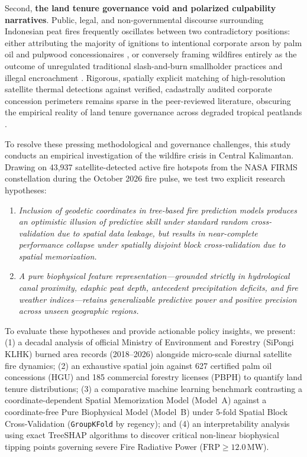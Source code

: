 Second, \textbf{the land tenure governance void and polarized culpability narratives}. Public, legal, and non-governmental discourse surrounding Indonesian peat fires frequently oscillates between two contradictory positions: either attributing the majority of ignitions to intentional corporate arson by palm oil and pulpwood concessionaires \citep{Tacconi2003CIFOR, Carlson2012PNAS}, or conversely framing wildfires entirely as the outcome of unregulated traditional slash-and-burn smallholder practices and illegal encroachment \citep{Cattau2016GCB}. Rigorous, spatially explicit matching of high-resolution satellite thermal detections against verified, cadastrally audited corporate concession perimeters remains sparse in the peer-reviewed literature, obscuring the empirical reality of land tenure governance across degraded tropical peatlands \citep{Putranto2023LandUsePol}.

To resolve these pressing methodological and governance challenges, this study conducts an empirical investigation of the wildfire crisis in Central Kalimantan. Drawing on 43,937 satellite-detected active fire hotspots from the NASA FIRMS constellation during the October 2026 fire pulse, we test two explicit research hypotheses:
\begin{enumerate}
    \item[$\mathbf{H_1}$:] \textit{Inclusion of geodetic coordinates in tree-based fire prediction models produces an optimistic illusion of predictive skill under standard random cross-validation due to spatial data leakage, but results in near-complete performance collapse under spatially disjoint block cross-validation due to spatial memorization.}
    \item[$\mathbf{H_2}$:] \textit{A pure biophysical feature representation---grounded strictly in hydrological canal proximity, edaphic peat depth, antecedent precipitation deficits, and fire weather indices---retains generalizable predictive power and positive precision across unseen geographic regions.}
\end{enumerate}

To evaluate these hypotheses and provide actionable policy insights, we present: (1) a decadal analysis of official Ministry of Environment and Forestry (SiPongi KLHK) burned area records (2018--2026) alongside micro-scale diurnal satellite fire dynamics; (2) an exhaustive spatial join against 627 certified palm oil concessions (HGU) and 185 commercial forestry licenses (PBPH) to quantify land tenure distributions; (3) a comparative machine learning benchmark contrasting a coordinate-dependent Spatial Memorization Model (Model~A) against a coordinate-free Pure Biophysical Model (Model~B) under 5-fold Spatial Block Cross-Validation (\texttt{GroupKFold} by regency); and (4) an interpretability analysis using exact TreeSHAP algorithms to discover critical non-linear biophysical tipping points governing severe Fire Radiative Power ($\text{FRP} \ge 12.0$\,MW).
